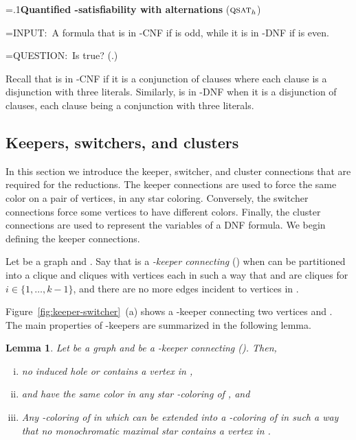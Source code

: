 \documentclass[a4paper, 11pt, oneside]{article}
\newtheorem{lemma}[theorem]{Lemma}
\newcommand{\qsat}[1]{\ensuremath{\textsc{qsat}_{#1}}}
\newcommand{\range}[3]{\ensuremath{#1 \in \{#2,\ldots,#3\}}}
\newenvironment{Problem}{\begin{Sbox}\begin{minipage}{\textwidth-2\parindent}\parskip=.1\baselineskip \vspace{.25\baselineskip}}{\vspace{.25\baselineskip}\end{minipage}\end{Sbox}\vspace{\baselineskip}\begin{center}\doublebox{\TheSbox}\end{center}\vspace{\baselineskip}}
\newcommand{\problemName}[1]{\noindent#1\vspace{.5\baselineskip}}
\newcommand{\InputTag}{\textsf{INPUT:}\ }
\newlength{\InputLength}\settowidth{\InputLength}{\InputTag}
\newcommand{\problemInput}[1]{\hangindent=\InputLength\InputTag #1}
\newcommand{\QuestionTag}{\textsf{QUESTION:}\ }
\newlength{\QuestionLength}\settowidth{\QuestionLength}{\QuestionTag}
\newcommand{\problemQuestion}[1]{\hangindent=\QuestionLength\QuestionTag #1}
\newcommand{\problem}[3]{\begin{Problem}\problemName{#1}\par\problemInput{#2}\par\problemQuestion{#3}\end{Problem}}
\let\Definition=\emph
\begin{document}
\problem{\textbf{Quantified -satisfiability with  alternations} (\qsat{h})}
{A formula  that is in -CNF if  is odd, while it is in -DNF if  is even.}
{Is  true? (.)}

Recall that  is in -CNF if it is a conjunction of clauses where each clause is a disjunction with three literals.  Similarly,  is in -DNF when it is a disjunction of clauses, each clause being a conjunction with three literals.

\subsection{Keepers, switchers, and clusters}

In this section we introduce the keeper, switcher, and cluster connections that are required for the reductions.  The keeper connections are used to force the same color on a pair of vertices, in any star coloring.  Conversely, the switcher connections force some vertices to have different colors.  Finally, the cluster connections are used to represent the variables of a DNF formula.  We begin defining the keeper connections.

\begin{defn}[-keeper]\label{def:k-keeper connection}
  Let  be a graph and .  Say that  is a \Definition{-keeper connecting } () when  can be partitioned into a clique  and  cliques  with  vertices each in such a way that  and  are cliques for \range{i}{1}{k-1}, and there are no more edges incident to vertices in .
\end{defn}

Figure~\ref{fig:keeper-switcher}~(a) shows a -keeper connecting two vertices  and . The main properties of -keepers are summarized in the following lemma.

\begin{lemma}\label{lem:keeper properties}
 Let  be a graph and  be a -keeper connecting  (). Then,
\begin{enumerate}[(i)]
  \item no induced hole or  contains a vertex in ,\label{lem:keeper properties:forbidden}
  \item  and  have the same color in any star -coloring of , and\label{lem:keeper properties:colors}
  \item Any -coloring  of  in which  can be extended into a -coloring of  in such a way that no monochromatic maximal star contains a vertex in .\label{lem:keeper properties:extension}
\end{enumerate}
\end{lemma}
\end{document}
